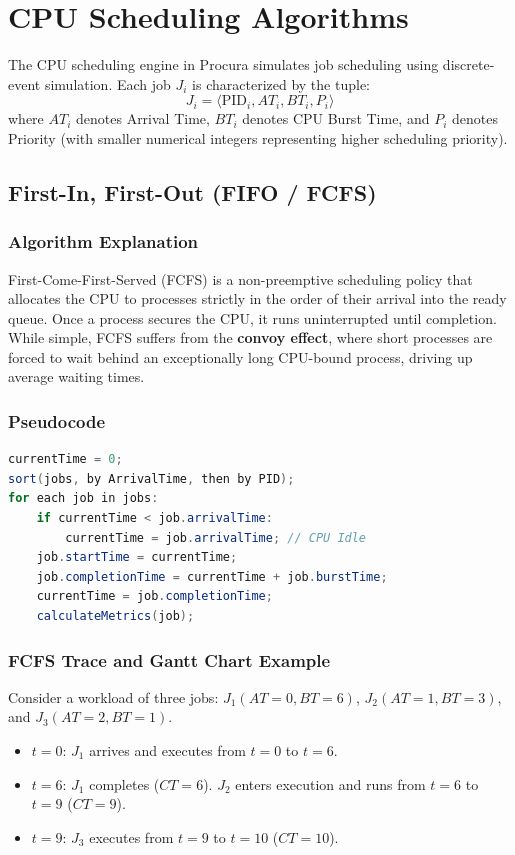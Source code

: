 \documentclass[12pt,a4paper]{article}
\begin{document}
\section{CPU Scheduling Algorithms}
The CPU scheduling engine in Procura simulates job scheduling using discrete-event simulation. Each job $J_i$ is characterized by the tuple:
\begin{equation}
J_i = \langle \text{PID}_i, AT_i, BT_i, P_i \rangle
\end{equation}
where $AT_i$ denotes Arrival Time, $BT_i$ denotes CPU Burst Time, and $P_i$ denotes Priority (with smaller numerical integers representing higher scheduling priority).

\subsection{First-In, First-Out (FIFO / FCFS)}
\subsubsection{Algorithm Explanation}
First-Come-First-Served (FCFS) is a non-preemptive scheduling policy that allocates the CPU to processes strictly in the order of their arrival into the ready queue. Once a process secures the CPU, it runs uninterrupted until completion. While simple, FCFS suffers from the \textbf{convoy effect}, where short processes are forced to wait behind an exceptionally long CPU-bound process, driving up average waiting times.

\subsubsection{Pseudocode}
\begin{lstlisting}[language=Java, caption={FCFS Scheduling Logic}]
currentTime = 0;
sort(jobs, by ArrivalTime, then by PID);
for each job in jobs:
    if currentTime < job.arrivalTime:
        currentTime = job.arrivalTime; // CPU Idle
    job.startTime = currentTime;
    job.completionTime = currentTime + job.burstTime;
    currentTime = job.completionTime;
    calculateMetrics(job);
\end{lstlisting}

\subsubsection{FCFS Trace and Gantt Chart Example}
Consider a workload of three jobs: $J_1(AT=0, BT=6)$, $J_2(AT=1, BT=3)$, and $J_3(AT=2, BT=1)$.
\begin{itemize}
    \item $t=0$: $J_1$ arrives and executes from $t=0$ to $t=6$.
    \item $t=6$: $J_1$ completes ($CT=6$). $J_2$ enters execution and runs from $t=6$ to $t=9$ ($CT=9$).
    \item $t=9$: $J_3$ executes from $t=9$ to $t=10$ ($CT=10$).
\end{itemize}
\end{document}
